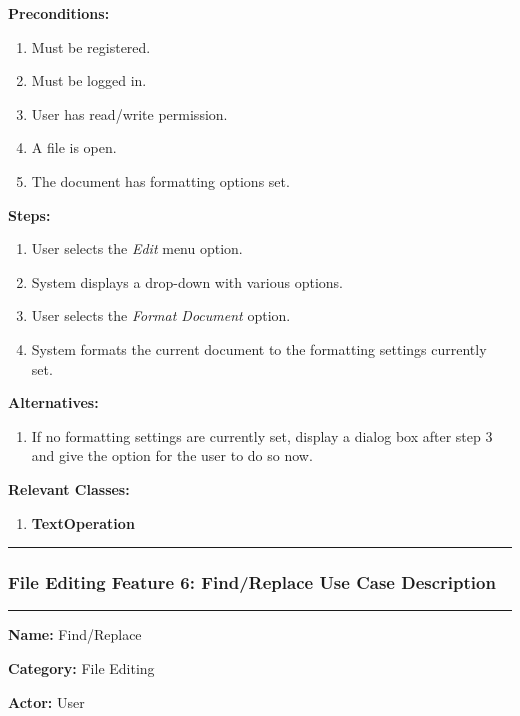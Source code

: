 \documentclass[twoside,letterpaper]{article}
\begin{document}
	\noindent\textbf{Preconditions:}
	\begin{enumerate}
		\item Must be registered.
		\item Must be logged in.
		\item User has read/write permission.
		\item A file is open.
		\item The document has formatting options set.
	\end{enumerate}
	\noindent\textbf{Steps:}
	\begin{enumerate}
		\item User selects the \textit{Edit} menu option.
		\item System displays a drop-down with various options.
		\item User selects the \textit{Format Document} option.
		\item System formats the current document to the formatting settings currently set.
	\end{enumerate}
	\noindent\textbf{Alternatives:}
	\begin{enumerate}
		\item If no formatting settings are currently set, display a dialog box after step 3 and give the option for the user to do so now.
	\end{enumerate}
	\noindent\textbf{Relevant Classes:}
	\begin{enumerate}
		\item \textbf{TextOperation}
	\end{enumerate}
\vspace{8pt}
\hrule
\newpage

\subsubsection[File Editing Feature 6: Find/Replace]{\rmfamily\bfseries\color{black}
	File Editing Feature 6: Find/Replace Use Case Description}
\hypertarget{RefHeading22059017292}{}

\vspace{2pt}
\hrule
\vspace{8pt}
	\noindent\textbf{Name:} Find/Replace \newline
	
	\noindent\textbf{Category:} File Editing \newline
	
	\noindent\textbf{Actor:} User \newline
	
\end{document}
